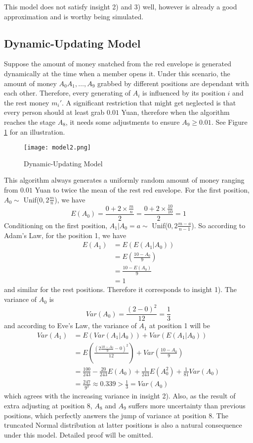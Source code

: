 \documentclass[10pt,journal]{IEEEtran}
\begin{document}
This model does not satisfy insight 2) and 3) well, however is already a good approximation and is worthy being simulated.
\subsection{Dynamic-Updating Model}
Suppose the amount of money snatched from the red envelope is generated dynamically at the time when a member opens it. Under this scenario, the amount of money $A_0 A_1, \dots ,A_9$ grabbed by different positions are dependant with each other. Therefore, every generating of $A_i$ is influenced by its position $i$ and the rest money $m_i'$. A significant restriction that might get neglected is that every person should at least grab $0.01$ Yuan, therefore when the algorithm reaches the stage $A_8$, it needs some adjustments to ensure $A_9 \ge 0.01$. See Figure \ref{fig:model2} for an illustration.
\begin{figure}[H]
	\centering
	\texttt{[image: model2.png]}
	\caption{Dynamic-Updating Model} \label{fig:model2}
\end{figure}
This algorithm always generates a uniformly random amount of money ranging from $0.01$ Yuan to twice the mean of the rest red envelope. For the first position, $A_0 \sim$ Unif($0, 2\frac{m}{n}$), we have
\[
	E(A_0) = \frac{0 + 2 \times \frac{m}{n}}{2} = \frac{0 + 2 \times \frac{10}{10}}{2} = 1
\]
Conditioning on the first position, $A_1|A_0 = a \sim$ Unif($0, 2\frac{m-a}{n-1}$). So according to Adam's Law, for the position 1, we have
\begin{equation*} \begin{aligned}
	E(A_1) &= E(E(A_1|A_0)) \\
		&= E(\frac{10 - A_0}{9}) \\
		&= \frac{10 - E(A_0)}{9} \\
		&= 1
\end{aligned} \end{equation*}
and similar for the rest positions. Therefore it corresponds to insight 1). The variance of $A_0$ is
\[
	Var(A_0) = \frac{(2-0)^2}{12} = \frac{1}{3}
\]
and according to Eve's Law, the variance of $A_1$ at position 1 will be
\begin{equation*} \begin{aligned}
	Var(A_1) &= E(Var(A_1|A_0)) + Var(E(A_1|A_0)) \\
		&= E(\frac{(2 \frac{10 - A_0}{9} - 0)^2}{12}) + Var(\frac{10 - A_0}{9}) \\
		&= \frac{100}{243} - \frac{20}{243} E(A_0) + \frac{1}{243} E(A_0^2) + \frac{1}{81} Var(A_0) \\
		&= \frac{247}{9^3} \approx 0.339 > \frac{1}{3} = Var(A_0)
\end{aligned} \end{equation*}
which agrees with the increasing variance in insight 2). Also, as the result of extra adjusting at position 8, $A_8$ and $A_9$ suffers more uncertainty than previous positions, which perfectly answers the jump of variance at position 8. The truncated Normal distribution at latter positions is also a natural consequence under this model. Detailed proof will be omitted.
\end{document}
